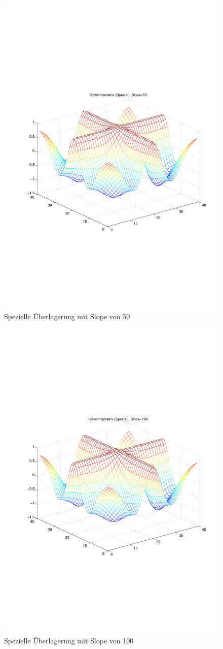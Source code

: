 \begin{figure}[hbt]
\begin{minipage}{0.5 \textwidth}
		\includegraphics[width=\textwidth]{./Bilder/Auswertung/Gewichtsmatrix/Gewichtsmatrix_Special_Slope_50}
		\caption{Spezielle Überlagerung mit Slope von 50}
		\label{Spezl50}
	\end{minipage}
\end{figure}

\begin{figure}[hbt]
	\centering
	\includegraphics[width=0.6\linewidth]{./Bilder/Auswertung/Gewichtsmatrix/Gewichtsmatrix_Special_Slope_100}
	\caption{Spezielle Überlagerung mit Slope von 100}
	\label{Spez100}
\end{figure}